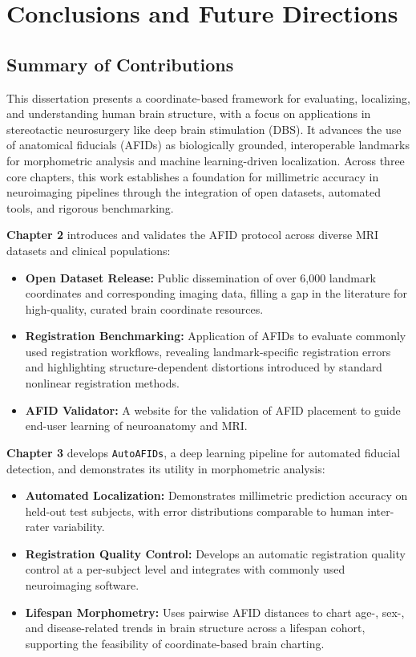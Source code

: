 \chapter{Conclusions and Future Directions}
\newpage
\sloppy
\section{Summary of Contributions}

This dissertation presents a coordinate-based framework for evaluating, localizing, and understanding human brain structure, with a focus on applications in stereotactic neurosurgery like deep brain stimulation (DBS). It advances the use of anatomical fiducials (AFIDs) as biologically grounded, interoperable landmarks for morphometric analysis and machine learning-driven localization. Across three core chapters, this work establishes a foundation for millimetric accuracy in neuroimaging pipelines through the integration of open datasets, automated tools, and rigorous benchmarking.

\textbf{Chapter 2} introduces and validates the AFID protocol across diverse MRI datasets and clinical populations:
\begin{itemize}
    \item \textbf{Open Dataset Release:} Public dissemination of over 6,000 landmark coordinates and corresponding imaging data, filling a gap in the literature for high-quality, curated brain coordinate resources.
    \item \textbf{Registration Benchmarking:} Application of AFIDs to evaluate commonly used registration workflows, revealing landmark-specific registration errors and highlighting structure-dependent distortions introduced by standard nonlinear registration methods.
    \item \textbf{AFID Validator:} A website for the validation of AFID placement to guide end-user learning of neuroanatomy and MRI.
\end{itemize}

\textbf{Chapter 3} develops \texttt{AutoAFIDs}, a deep learning pipeline for automated fiducial detection, and demonstrates its utility in morphometric analysis:
\begin{itemize}
    \item \textbf{Automated Localization:} Demonstrates millimetric prediction accuracy on held-out test subjects, with error distributions comparable to human inter-rater variability.
    \item \textbf{Registration Quality Control:} Develops an automatic registration quality control at a per-subject level and integrates with commonly used neuroimaging software. 
    \item \textbf{Lifespan Morphometry:} Uses pairwise AFID distances to chart age-, sex-, and disease-related trends in brain structure across a lifespan cohort, supporting the feasibility of coordinate-based brain charting.
\end{itemize}

